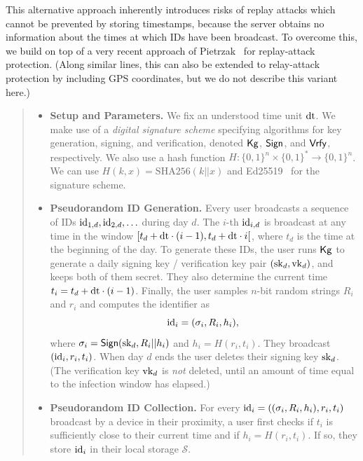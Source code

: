 \documentclass{article}
\begin{document}
This alternative approach inherently introduces risks of replay attacks which cannot be prevented by storing timestamps, because the server obtains no information about the times at which IDs have been broadcast. To overcome this, we build on top of a very recent approach of Pietrzak~\cite{EPRINT:Pietrzak20} for replay-attack protection. (Along similar lines, this can also be extended to relay-attack protection by including GPS coordinates, but we do not describe this variant here.)

\begin{quote}
\begin{itemize}
    \item {\bf Setup and Parameters.} We fix an understood time unit $\mathrm{dt}$. We make use of a \emph{digital signature scheme} specifying algorithms for key generation, signing, and verification, denoted $\mathsf{Kg}$, $\mathsf{Sign}$, and $\mathsf{Vrfy}$, respectively. We also use a hash function $H:\{0,1\}^n\times\{0,1\}^\ast\to\{0,1\}^n$. We can use $H(k,x)=\textrm{SHA256}(k||x)$ and Ed25519~\cite{bernstein,Ed25519} for the signature scheme.
    \item {\bf Pseudorandom ID Generation.} Every user broadcasts a sequence of IDs $\mathrm{id}_{1,d}, \mathrm{id}_{2,d}, \ldots$ during day $d$.  The $i$-th $\mathrm{id}_{i,d}$ is broadcast at any time in the window $[t_d+ \mathrm{dt}\cdot (i-1), t_d + \mathrm{dt}\cdot i[$, where $t_d$ is the time at the beginning of the day. To generate these IDs, the user runs $\mathsf{Kg}$ to generate a daily signing key / verification key pair $(\mathrm{sk}_{d}, \mathrm{vk}_{d})$, and keeps both of them secret. They also determine the current time $t_i=t_d+ \mathrm{dt}\cdot (i-1)$. %
    Finally, the user samples $n$-bit random strings $R_i$ and $r_i$ and computes the identifier as 
		\begin{displaymath}
		\mathrm{id}_i = (\sigma_i, R_i, h_i), \;
		\end{displaymath}
		where $\sigma_i = \mathsf{Sign}(\mathrm{sk}_{d}, R_i|| h_i)$ and $h_i=H(r_i, t_i)$.
		They broadcast $(\mathrm{id}_i, r_i, t_i)$.
		When day $d$ ends the user deletes their signing key $\mathrm{sk}_d$. (The verification key $\mathrm{vk}_d$ is {\em not} deleted, until an amount of time equal to the infection window has elapsed.)
	\item {\bf Pseudorandom ID Collection.} For every $\mathrm{id}_i = ((\sigma_i, R_i, h_i),r_i, t_i)$ broadcast by a device in their proximity, a user first checks if $t_i$ is sufficiently close to their current time and if $h_i = H(r_i, t_i)$. If so, they store $\mathrm{id}_i$ in their local storage $\mathcal{S}$.

\end{itemize}
\end{quote}
\end{document}
